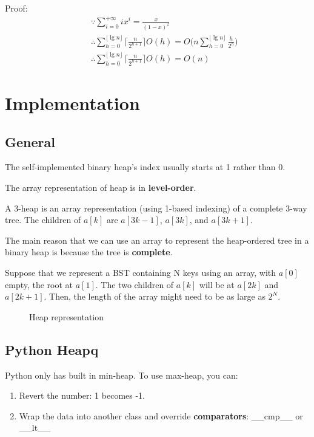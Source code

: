 Proof:
\begin{eqnarray*}
&& \because \sum_{i=0}^{+\infty} {ix^i} =\frac{x}{(1-x)^2} \\
&& \therefore \sum_{h=0}^{\lfloor\lg n\rfloor}{\Big\lceil\frac{n}{2^{h+1}}\Big\rceil
O(h)} = O\Bigg(n\sum_{h=0}^{\lfloor\lg n\rfloor}{\frac{h}{2^h}}\Bigg) \\
&& \therefore \sum_{h=0}^{\lfloor\lg n\rfloor}{\Big\lceil\frac{n}{2^{h+1}}\Big\rceil
O(h)} = O(n)
\end{eqnarray*}

\section{Implementation}
\subsection{General}
The self-implemented binary heap's index usually starts at 1 rather than 0. 

The array representation of heap is in \textbf{level-order}.

A 3-heap is an array representation (using 1-based indexing) of a complete 3-way tree. The children of $a[k]$ are $a[3k-1]$, $a[3k]$, and $a[3k+1]$.

The main reason that we can use an array to represent the heap-ordered tree in a binary heap is because the tree is \textbf{complete}.

Suppose that we represent a BST containing N keys using an array, with $a[0]$ empty, the root at $a[1]$. The two children of $a[k]$ will be at $a[2k]$ and $a[2k+1]$. Then, the length of the array might need to be as large as $2^N$.

\begin{figure}[hbtp]
\centering
{}
\caption{Heap representation}
\label{fig:heap} 
\end{figure}

\subsection{Python Heapq}
Python only has built in min-heap. To use max-heap, you can: 
\begin{enumerate}
\item Revert the number: 1 becomes -1.
\item Wrap the data into another class and override \textbf{comparators}: \_\_cmp\_\_ or \_\_lt\_\_
\end{enumerate}

